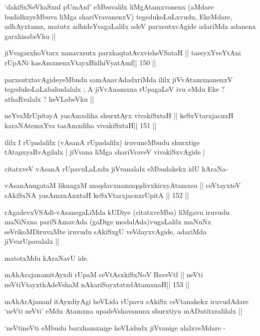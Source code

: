 \begin{artha}
`dakiSxNeV\s kaSxnf pUmAnf' eMbuvalilx liMgAtamxvanenx (aMdare
  budidhxyeMbuva liMga shariVravanenxV) tegedukoLuLxvudu, EkeMdare,
  adhAyxtamx, matutx adhideYvagaLalilx adeV parxsutxvAgide adariMda
  adanenx garxhisabeVku ||
\end{artha}

\begin{shl}
jiVvagarxhoV\s tarx nanavxsutx parxkaqtatAvxvisheVSataH ||
taseyxYveYtAni rUpANi kasAmxnenxVtayxBidhiVyatAmf\hfill || 150 ||
\end{shl}

\begin{artha}
parxsutxtavAgideyeMbudu samAnavAdadxriMda ililx jiVvAtamxnanenxV
tegedukoLaLxbahudalalx ; A jiVvAnamxna rUpagaLeV ivu eMdu Eke ?
athaRvalalx ? heVLabeVku ||
\end{artha}

\begin{shl}
neYvaMrUpitayA yasAmxdiha shurxtAyx vivakiSxtaH ||
keSxVtarxjacnxH karaNAtemxYva tasAmxdiha vivakiSxtaH\hfill || 151 ||
\end{shl}

\begin{artha}
ililx I rUpadalilx (vAsanA rUpadalilx) iruvuneMbudu shurxtige
tAtapxyaRvAgilalx | jiVvana liMga shariVraveV vivakiSxvAgide |

citatxveV vAsanA rUpavuLaLxdu jiVvanalalx eMbudakekx idU kAraNa-
\end{artha}

\begin{shl}
vAsanAnugataM liknagxM maqdavxnamxqqdivxkirxyAtamxsu ||
ceVtayxteV sAkiSxNA yasAmxnAnxtaH keSxVtarxjacnxrUpitA \hfill || 152 ||
\end{shl}

\begin{artha}
rAgadevxVSAdi-vAsanegaLiMda kUDiye (citatxveMba) liMgavu iruvudu
maNiNxna pariNAmavAda (gaDige modalAda)vugaLalilx maNuNx
seVrikoMDiruvaMte iruvudu sAkiSxgU veVdayxvAgide, adariMda
jiVvarUpavalalx ||

matotxMdu kAraNavU ide.
\end{artha}

\begin{shl}
mAhArajanamitAyxdi rUpaM ceVtAsxkiSxNoV BaveVtf ||
neVti neVtiVtayxthA\s\s deVshaM nAkariSayxtatxdA\s\s tamxnaH\hfill || 153 ||
\end{shl}

\begin{artha}
mAhArAjananf itAyxdiyAgi heVLida rUpavu sAkiSx ceVtanakekx iruvudAdare
`neVti neVti' eMdu Atamxna upadeVshavanunx shurxtiyu mADutitxralilalx
||

`neVtineVti eMbudu barxhamxnige heVLidudx jiVvanige alalxveMdare -
\end{artha}

